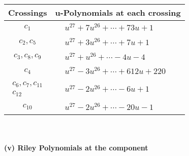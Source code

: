 \documentclass[1p]{elsarticle_modified}
\theoremstyle{definition}
\begin{document}
\begin{tabular}{m{50pt}|m{274pt}}
Crossings & \hspace{64pt}u-Polynomials at each crossing \\
\hline $$\begin{aligned}c_{1}\end{aligned}$$&$\begin{aligned}
&u^{27}+7 u^{26}+\cdots+73 u+1
\end{aligned}$\\
\hline $$\begin{aligned}c_{2},c_{5}\end{aligned}$$&$\begin{aligned}
&u^{27}+3 u^{26}+\cdots+7 u+1
\end{aligned}$\\
\hline $$\begin{aligned}c_{3},c_{8},c_{9}\end{aligned}$$&$\begin{aligned}
&u^{27}+u^{26}+\cdots-4 u-4
\end{aligned}$\\
\hline $$\begin{aligned}c_{4}\end{aligned}$$&$\begin{aligned}
&u^{27}-3 u^{26}+\cdots+612 u+220
\end{aligned}$\\
\hline $$\begin{aligned}c_{6},c_{7},c_{11}\\c_{12}\end{aligned}$$&$\begin{aligned}
&u^{27}-2 u^{26}+\cdots-6 u+1
\end{aligned}$\\
\hline $$\begin{aligned}c_{10}\end{aligned}$$&$\begin{aligned}
&u^{27}-2 u^{26}+\cdots-20 u-1
\end{aligned}$\\
\hline
\end{tabular}\\~\\
\newpage\renewcommand{\arraystretch}{1}
\flushleft \textbf{(v) Riley Polynomials at the component}\newline \\
\end{document}
